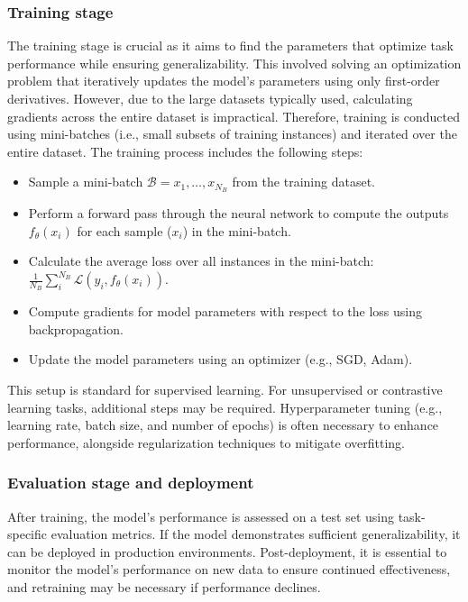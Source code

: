 \subsubsection{Training stage}
The training stage is crucial as it aims to find the parameters that optimize task performance while ensuring generalizability. This involved solving an optimization problem that iteratively updates the model's parameters using only first-order derivatives. However, due to the large datasets typically used, calculating gradients across the entire dataset is impractical. Therefore, training is conducted using mini-batches (i.e., small subsets of training instances) and iterated over the entire dataset. The training process includes the following steps:
\begin{itemize}
    \item Sample a mini-batch $\mathcal{B} = {x_1, \ldots, x_{N_B}}$ from the training dataset.
    \item Perform a forward pass through the neural network to compute the outputs $f_{\theta}(x_i)$ for each sample ($x_i$) in the mini-batch.
    \item Calculate the average loss over all instances in the mini-batch: $\frac{1}{N_B} \sum_{i}^{N_B} \mathcal{L}(y_i, f_{\theta}(x_i))$.
    \item Compute gradients for model parameters with respect to the loss using backpropagation.
    \item Update the model parameters using an optimizer (e.g., SGD, Adam).
\end{itemize}


This setup is standard for supervised learning. For unsupervised or contrastive learning tasks, additional steps may be required. Hyperparameter tuning (e.g., learning rate, batch size, and number of epochs) is often necessary to enhance performance, alongside regularization techniques to mitigate overfitting.

\subsubsection{Evaluation stage and deployment}
After training, the model's performance is assessed on a test set using task-specific evaluation metrics. If the model demonstrates sufficient generalizability, it can be deployed in production environments. Post-deployment, it is essential to monitor the model's performance on new data to ensure continued effectiveness, and retraining may be necessary if performance declines.


